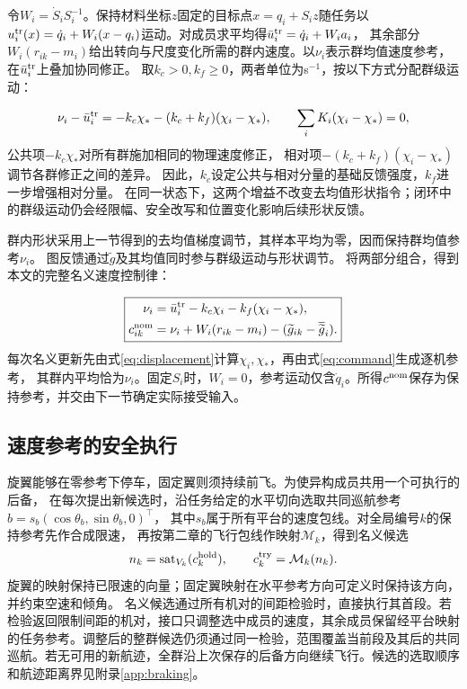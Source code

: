 \documentclass[UTF8,a4paper,11pt,fontset=none]{ctexart}
\begin{document}
令$W_i=\dot S_iS_i^{-1}$。保持材料坐标$z$固定的目标点$x=q_i+S_i z$随任务以
$u_i^{\rm tr}(x)=\dot q_i+W_i(x-q_i)$运动。对成员求平均得$\bar u_i^{\rm tr}=\dot q_i+W_i a_i$，
其余部分$W_i(r_{ik}-m_i)$给出转向与尺度变化所需的群内速度。以$\nu_i$表示群均值速度参考，在$\bar u_i^{\rm tr}$上叠加协同修正。
取$k_c>0,k_f\ge0$，两者单位为s$^{-1}$，按以下方式分配群级运动：

\begin{equation}
\nu_i-\bar u_i^{\rm tr}=-k_c\chi_*-(k_c+k_f)(\chi_i-\chi_*),\qquad
\sum_iK_i(\chi_i-\chi_*)=0,
\label{eq:mode-interpretation}
\end{equation}
公共项$-k_c\chi_*$对所有群施加相同的物理速度修正，
相对项$-(k_c+k_f)(\chi_i-\chi_*)$调节各群修正之间的差异。
因此，$k_c$设定公共与相对分量的基础反馈强度，$k_f$进一步增强相对分量。
在同一状态下，这两个增益不改变去均值形状指令；闭环中的群级运动仍会经限幅、安全改写和位置变化影响后续形状反馈。

群内形状采用上一节得到的去均值梯度调节，其样本平均为零，因而保持群均值参考$\nu_i$。
图反馈通过$\widetilde g$及其均值同时参与群级运动与形状调节。
将两部分组合，得到本文的完整名义速度控制律：

\begin{equation}
\boxed{\begin{aligned}
\nu_i&=\bar u_i^{\rm tr}-k_c\chi_i-k_f(\chi_i-\chi_*),\\
c^{\rm nom}_{ik}&=\nu_i+W_i(r_{ik}-m_i)-(\widetilde g_{ik}-\overline{\widetilde g}_i).
\end{aligned}}
\label{eq:command}
\end{equation}
每次名义更新先由式\eqref{eq:displacement}计算$\chi_i,\chi_*$，再由式\eqref{eq:command}生成逐机参考，
其群内平均恰为$\nu_i$。固定$S_i$时，$W_i=0$，参考运动仅含$\dot q_i$。所得$c^{\rm nom}$保存为保持参考，并交由下一节确定实际接受输入。

\subsection{速度参考的安全执行}\label{sec:safe-execution}
旋翼能够在零参考下停车，固定翼则须持续前飞。为使异构成员共用一个可执行的后备，
在每次提出新候选时，沿任务给定的水平切向选取共同巡航参考$b=s_b(\cos\theta_b,\sin\theta_b,0)^\top$，
其中$s_b$属于所有平台的速度包线。对全局编号$k$的保持参考先作合成限速，
再按第二章的飞行包线作映射$\mathcal M_k$，得到名义候选
\begin{equation}
n_k=\operatorname{sat}_{V_k}(c_k^{\rm hold}),\qquad c_k^{\rm try}=\mathcal M_k(n_k).
\label{eq:candidates}
\end{equation}
旋翼的映射保持已限速的向量；固定翼映射在水平参考方向可定义时保持该方向，并约束空速和倾角。
名义候选通过所有机对的间距检验时，直接执行其首段。若检验返回限制间距的机对，接口只调整选中成员的速度，其余成员保留经平台映射的任务参考。调整后的整群候选仍须通过同一检验，范围覆盖当前段及其后的共同巡航。若无可用的新航迹，全群沿上次保存的后备方向继续飞行。候选的选取顺序和航迹距离界见附录\ref{app:braking}。
\end{document}
